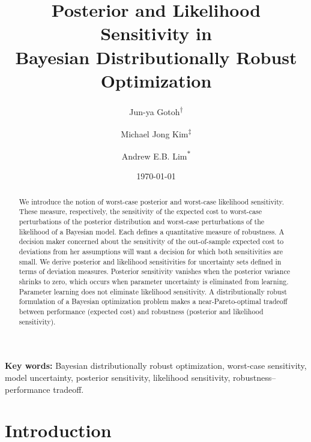 \documentclass[11pt,reqno,letter]{amsart}
\title[Posterior and Likelihood Sensitivity in Bayesian DRO]{Posterior and Likelihood Sensitivity in \\Bayesian Distributionally Robust Optimization}
\date{\today}
\author[Gotoh]{Jun-ya Gotoh\textsuperscript{$\dagger$}}
\author[Kim]{Michael Jong Kim\textsuperscript{$\ddagger$}}
\author[Lim]{Andrew E.B. Lim\textsuperscript{$*$}}
\theoremstyle{plain}
\theoremstyle{definition}
\numberwithin{equation}{section}
\numberwithin{theorem}{section}
\numberwithin{table}{section}
\numberwithin{figure}{section}
\begin{document}


\begin{abstract}
We introduce the notion of worst-case posterior and worst-case likelihood sensitivity. These measure, respectively, the sensitivity of the expected cost to worst-case perturbations of the posterior distribution and worst-case perturbations of the likelihood of a Bayesian model. Each defines a quantitative measure of robustness. A decision maker concerned about the sensitivity of the out-of-sample expected cost to deviations from her assumptions will want a decision for which both sensitivities are small. We derive posterior and likelihood sensitivities for uncertainty sets defined in terms of deviation measures. Posterior sensitivity vanishes when the posterior variance shrinks to zero, which occurs when parameter uncertainty is eliminated from learning. Parameter learning does not  eliminate likelihood sensitivity. A distributionally robust formulation of a Bayesian optimization problem makes a near-Pareto-optimal tradeoff between performance (expected cost) and robustness (posterior and likelihood sensitivity).



\end{abstract}


\maketitle

{\bf Key words:} Bayesian distributionally robust optimization, worst-case sensitivity, model uncertainty, posterior sensitivity, likelihood sensitivity, robustness--performance tradeoff.


\section{Introduction}

\end{document}
